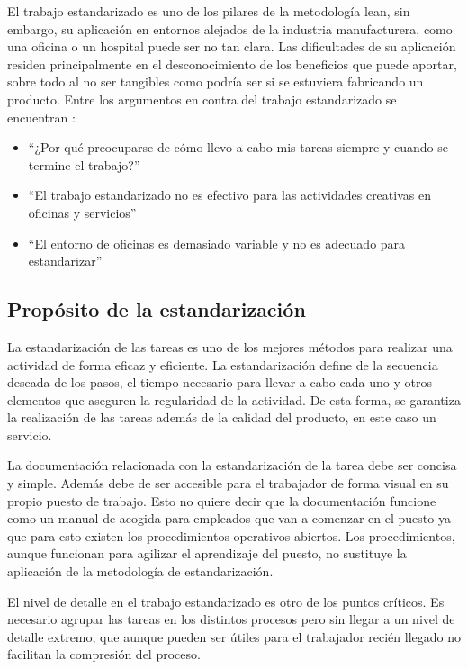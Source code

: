 El trabajo estandarizado es uno de los pilares de la metodología lean, sin embargo, su aplicación en entornos alejados de la industria manufacturera, como una oficina o un hospital puede ser no tan clara.
Las dificultades de su aplicación residen principalmente en el desconocimiento de los beneficios que puede aportar, sobre todo al no ser tangibles como podría ser si se estuviera fabricando un producto.
Entre los argumentos en contra del trabajo estandarizado se encuentran \cite{locher_lean_2017}:

\begin{itemize}
    \item ``¿Por qué preocuparse de cómo llevo a cabo mis tareas siempre y cuando se termine el trabajo?''
    \item ``El trabajo estandarizado no es efectivo para las actividades creativas en oficinas y servicios''
    \item ``El entorno de oficinas es demasiado variable y no es adecuado para estandarizar''
\end{itemize}

\subsection{Propósito de la estandarización}

La estandarización de las tareas es uno de los mejores métodos para realizar una actividad de forma eficaz y eficiente. La estandarización define de la secuencia deseada de los pasos, el tiempo necesario para llevar a cabo cada uno y otros elementos que aseguren la regularidad de la actividad. De esta forma, se garantiza la realización de las tareas además de la calidad del producto, en este caso un servicio.

La documentación relacionada con la estandarización de la tarea debe ser concisa y simple.
Además debe de ser accesible para el trabajador de forma visual en su propio puesto de trabajo.
Esto no quiere decir que la documentación funcione como un manual de acogida para empleados que van a comenzar en el puesto ya que para esto existen los procedimientos operativos abiertos.
Los procedimientos, aunque funcionan para agilizar el aprendizaje del puesto, no sustituye la aplicación de la metodología de estandarización.

El nivel de detalle en el trabajo estandarizado es otro de los puntos críticos. Es necesario agrupar las tareas en los distintos procesos pero sin llegar a un nivel de detalle extremo, que aunque pueden ser útiles para el trabajador recién llegado no facilitan la compresión del proceso.

